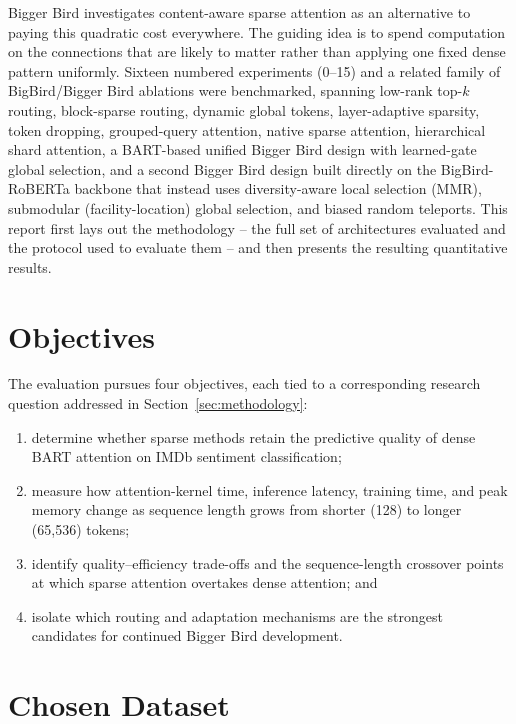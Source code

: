 \documentclass[11pt]{article}
\begin{document}
Bigger Bird investigates content-aware sparse attention as an alternative to
paying this quadratic cost everywhere. The guiding idea is to spend computation
on the connections that are likely to matter rather than applying one fixed
dense pattern uniformly. Sixteen numbered experiments (0--15) and a related
family of BigBird/Bigger Bird ablations were benchmarked, spanning low-rank
top-$k$ routing, block-sparse routing, dynamic global tokens, layer-adaptive
sparsity, token dropping, grouped-query attention, native sparse attention,
hierarchical shard attention, a BART-based unified Bigger Bird design with
learned-gate global selection, and a second Bigger Bird design built directly
on the BigBird-RoBERTa backbone that instead uses diversity-aware local
selection (MMR), submodular (facility-location) global selection, and biased
random teleports. This report first lays out the methodology -- the full set
of architectures evaluated and the protocol used to evaluate them -- and then
presents the resulting quantitative results.

\section{Objectives}

The evaluation pursues four objectives, each tied to a corresponding research
question addressed in Section~\ref{sec:methodology}:

\begin{enumerate}
  \item determine whether sparse methods retain the predictive quality of dense
  BART attention on IMDb sentiment classification;
  \item measure how attention-kernel time, inference latency, training time,
  and peak memory change as sequence length grows from shorter (128) to longer (65{,}536) tokens;
  \item identify quality--efficiency trade-offs and the sequence-length
  crossover points at which sparse attention overtakes dense attention; and
  \item isolate which routing and adaptation mechanisms are the strongest
  candidates for continued Bigger Bird development.
\end{enumerate}

\section{Chosen Dataset}
\label{sec:dataset}
\end{document}
